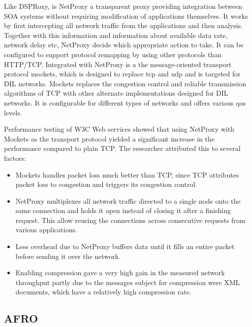 Like DSPRoxy, is NetProxy a transparent proxy providing integration between SOA
systems without requiring modification of applications themselves. It works by
first intercepting all network traffic from the applications and then analysis.
Together with this information and information about available data rate,
network delay etc, NetProxy decide which appropriate action to take. It can be
configured to support protocol remapping by using other protocols than HTTP/TCP.
Integrated with NetProxy is a the message-oriented transport protocol
\gls{mockets}, which is designed to replace \gls{tcp} and \gls{udp} and is
targeted for DIL networks\cite{suri-netproxy}. Mockets replaces the congestion
control and reliable transmission algorithms of TCP with other alternate
implementations designed for DIL networks. It is configurable for different
types of networks and offers various \gls{qos} levels.

Performance testing of W3C Web services showed that using NetProxy with Mockets as
the transport protocol yielded a significant increase in the performance
compared to plain TCP\cite{suri-netproxy}. The researcher attributed this to
several factors:

\begin{itemize}

    \item Mockets handles packet loss much better than TCP, since TCP attributes
    packet loss to congestion and triggers its congestion control.

    \item NetProxy multiplexes all network traffic directed to a single node
    onto the same connection and holds it open instead of closing it after a
    finishing request. This allow reusing the connections across consecutive
    requests from various applications.

    \item Less overhead due to NetProxy buffers data until it fills an
    entire packet before sending it over the network.

    \item Enabling compression gave a very high gain in the measured network
    throughput partly due to the messages subject for compression were XML
    documents, which have a relatively high compression rate.

\end{itemize}

\subsection{AFRO}

